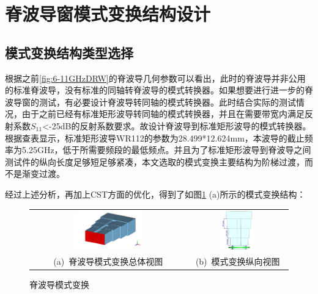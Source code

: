 \documentclass[master]{thesis-uestc}
\begin{document}
\section{脊波导窗模式变换结构设计}
\subsection{模式变换结构类型选择}
根据之前\ref{fig:6-11GHzDRW}的脊波导几何参数可以看出，此时的脊波导并非公用的标准脊波导，没有标准的同轴转脊波导的模式转换器。如果想要进行进一步的脊波导窗的测试，有必要设计脊波导转同轴的模式转换器。此时结合实际的测试情况，由于之前已经有标准矩形波导转同轴的模式转换器，并且在需要带宽内满足反射系数$S_{11}$<-25dB的反射系数要求。故设计脊波导到标准矩形波导的模式转换器。根据查表显示，标准矩形波导WR112的参数为28.499*12.624mm，本波导的截止频率为5.25GHz，低于所需要频段的最低频点。并且为了标准矩形波导到脊波导之间测试件的纵向长度足够短足够紧凑，本文选取的模式变换主要结构为阶梯过渡，而不是渐变过渡。

经过上述分析，再加上CST方面的优化，得到了如图\ref{fig:脊波导模式变换} (a)所示的模式变换结构：

\begin{figure}[!htb]
    \small
    \centering
    \begin{tabular}{@{\ }c@{\ }c}
        \includegraphics[width=0.45\textwidth]{pic/chapter3/脊波导模式变换.png} & 
        \hspace{5pt}
        \includegraphics[width=0.35\textwidth]{pic/chapter3/模式变换纵向长度.png}     \\
        \mbox{\small (a) 脊波导模式变换总体视图}                                                                               & 
        \mbox{\small (b) 模式变换纵向视图}                                                                                  \\
    \end{tabular}
    \caption{脊波导模式变换}
    \label{fig:脊波导模式变换}
\end{figure}
\end{document}
